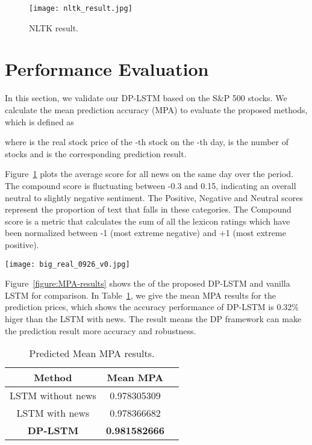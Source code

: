 \documentclass{article}
\begin{document}
\begin{figure}
  \centering
  \texttt{[image: nltk\_result.jpg]}
  \caption{NLTK result.}
  \label{nltk}
\end{figure}




\section{Performance Evaluation}
\label{others}

In this section, we validate our DP-LSTM based on the S\&P 500 stocks. 
We calculate the mean prediction accuracy (MPA) to evaluate the proposed methods, which is defined as 

where  is the real stock price of the -th stock on the -th day,  is the number of stocks and  is the corresponding prediction result. 

Figure~\ref{nltk} plots the average score for all news on the same day over the period. The compound score is fluctuating between -0.3 and 0.15, indicating an overall neutral to slightly negative sentiment. The Positive, Negative and Neutral scores represent the proportion of text that falls in these categories. 
The Compound score is a metric that calculates the sum of all the lexicon ratings which have been normalized between -1 (most extreme negative) and +1 (most extreme positive).


\begin{figure*}[!htb]
	\centering
	\texttt{[image: big\_real\_0926\_v0.jpg]}
	\caption{Mean prediction accuracies of the DP-LSTM and vanilla LSTM.}
	\label{figure:MPA-results}
\end{figure*}


Figure~\ref{figure:MPA-results} shows the  of the proposed DP-LSTM and vanilla LSTM for comparison.  In Table~\ref{tab:MPA}, we give the mean MPA results for the prediction prices, which shows the accuracy performance of DP-LSTM is 0.32\% higer than the LSTM with news. The result means the DP framework can make the prediction result more accuracy and robustness. 


\begin{table}
\centering
\begin{tabular}{ccc}  
\toprule
Method  & Mean MPA \\
\midrule
LSTM without news     &  0.978305309 \\
LSTM with news     &  0.978366682 \\
\textbf{DP-LSTM}    & \textbf{0.981582666}  \\
\bottomrule
\end{tabular}
\caption{Predicted Mean MPA results.}
\label{tab:MPA}
\end{table}
\end{document}
